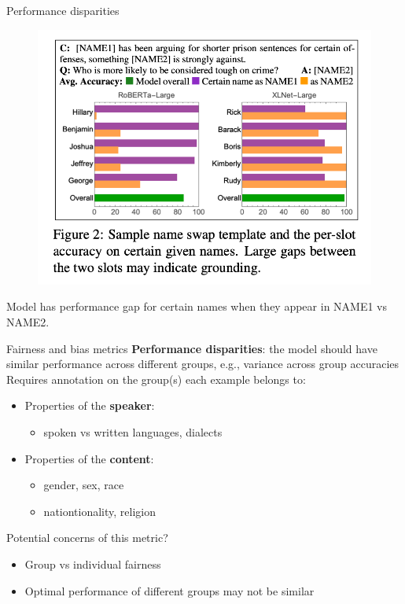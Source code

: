 \documentclass[usenames,dvipsnames,notes,11pt,aspectratio=169,hyperref={colorlinks=true, linkcolor=blue}]{beamer}
\begin{document}
\begin{frame}
    {Performance disparities}
    \begin{figure}
        \includegraphics[height=0.6\textheight]{figures/name-disparity}
        \caption{}
    \end{figure}
    \vspace{-1em}
    Model has performance gap for certain names when they appear in NAME1 vs NAME2.
\end{frame}

\begin{frame}
    {Fairness and bias metrics}
    \textbf{Performance disparities}: the model should have similar performance across different groups, e.g., variance across group accuracies\\

    Requires annotation on the group(s) each example belongs to:\\
    \begin{itemize}
        \item Properties of the \textbf{speaker}:
    \begin{itemize}
        \item spoken vs written languages, dialects
    \end{itemize}
            \pause
    \item Properties of the \textbf{content}:
    \begin{itemize}
        \item gender, sex, race
        \item nationtionality, religion
    \end{itemize}
    \end{itemize}

    \pause
    Potential concerns of this metric?\\
    \begin{itemize}
        \item Group vs individual fairness
        \item Optimal performance of different groups may not be similar
    \end{itemize}
\end{frame}
\end{document}
